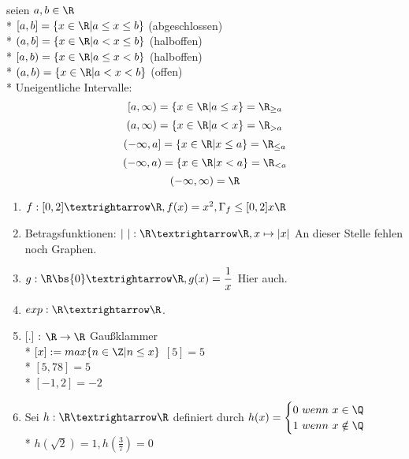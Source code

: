 \begin{wrapfigure}{r}{0.2\textwidth}
  \begin{center}
  \end{center}
\end{wrapfigure}
seien $a, b \in \R$ \\*
$[a, b] = \{x \in \R| a \leq x \leq b\}$ (abgeschlossen)\\*
$(a, b] = \{x \in \R| a < x \leq b\}$ (halboffen)\\*
$[a, b) = \{x \in \R| a \leq x < b\}$ (halboffen)\\* %
$(a, b) = \{x \in \R| a < x < b\}$ (offen)\\*
%
Uneigentliche Intervalle:
$$[a, \infty) = \{x \in \R | a \leq x\} = \R_{\geq a}$$
$$(a, \infty) = \{x \in \R | a < x\} = \R_{> a}$$
$$(- \infty, a] = \{x \in \R | x \leq a\} = \R_{\leq a}$$
$$(- \infty, a) = \{x \in \R | x < a\} = \R_{< a}$$
$$(- \infty, \infty) = \R$$
%
\begin{enumerate}
\item{$f:[0,2]→\R, f(x)=x^2, \Gamma_f \leq [0,2] x\R$}
\item{Betragsfunktionen: $|\ |: \R→\R, x\mapsto|x|$
}
An dieser Stelle fehlen noch Graphen.
\item{$g:\R\bs\{0\}→\R, g(x)=\dfrac{1}{x}$
Hier auch.
}
\item{$exp:\R→\R$.}
\item{[.] : $\R \to \R$ Gaußklammer\\*
$[x] := max\{n \in \Z | n \leq x \}$
\bsp
$[5] = 5$\\*
$[5,78] = 5$\\*
$[-1,2] = -2$}
\item{Sei $h:\R→\R$ definiert durch $h(x)=\begin{cases}0\ wenn\ x\in\Q\\* 1\ wenn\ x\notin\Q\end{cases}$\\*
$h(\sqrt{2}) = 1, h (\frac{3}{7}) = 0$}
\end{enumerate}
